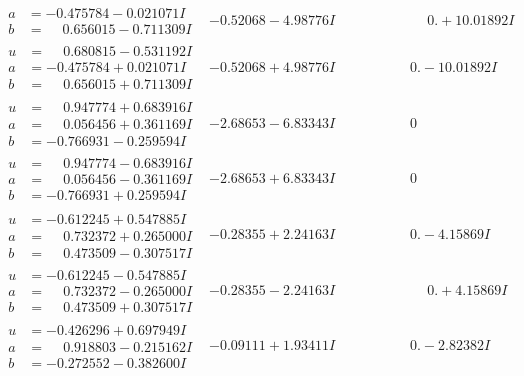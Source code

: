 \documentclass[1p]{elsarticle_modified}
\theoremstyle{definition}
\begin{document}
$$\begin{array}{c|c|c}
\begin{aligned}
a &= -0.475784 - 0.021071 I \\
b &= \phantom{-}0.656015 - 0.711309 I\end{aligned}
 & -0.52068 - 4.98776 I & \phantom{-0.000000 -}0. + 10.01892 I \\ \hline\begin{aligned}
u &= \phantom{-}0.680815 - 0.531192 I \\
a &= -0.475784 + 0.021071 I \\
b &= \phantom{-}0.656015 + 0.711309 I\end{aligned}
 & -0.52068 + 4.98776 I & \phantom{-0.000000 } 0. - 10.01892 I \\ \hline\begin{aligned}
u &= \phantom{-}0.947774 + 0.683916 I \\
a &= \phantom{-}0.056456 + 0.361169 I \\
b &= -0.766931 - 0.259594 I\end{aligned}
 & -2.68653 - 6.83343 I & \phantom{-0.000000 } 0 \\ \hline\begin{aligned}
u &= \phantom{-}0.947774 - 0.683916 I \\
a &= \phantom{-}0.056456 - 0.361169 I \\
b &= -0.766931 + 0.259594 I\end{aligned}
 & -2.68653 + 6.83343 I & \phantom{-0.000000 } 0 \\ \hline\begin{aligned}
u &= -0.612245 + 0.547885 I \\
a &= \phantom{-}0.732372 + 0.265000 I \\
b &= \phantom{-}0.473509 - 0.307517 I\end{aligned}
 & -0.28355 + 2.24163 I & \phantom{-0.000000 } 0. - 4.15869 I \\ \hline\begin{aligned}
u &= -0.612245 - 0.547885 I \\
a &= \phantom{-}0.732372 - 0.265000 I \\
b &= \phantom{-}0.473509 + 0.307517 I\end{aligned}
 & -0.28355 - 2.24163 I & \phantom{-0.000000 -}0. + 4.15869 I \\ \hline\begin{aligned}
u &= -0.426296 + 0.697949 I \\
a &= \phantom{-}0.918803 - 0.215162 I \\
b &= -0.272552 - 0.382600 I\end{aligned}
 & -0.09111 + 1.93411 I & \phantom{-0.000000 } 0. - 2.82382 I \\ \hline\begin{aligned}

\end{aligned}
\end{array}$$
\end{document}
